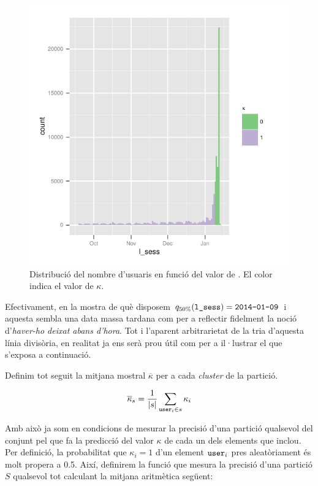\documentclass[
	a4paper,
	twoside,
	justified
]{tufte-book}
\begin{document}
\begin{figure}
\begin{center}
\includegraphics{l_sess_equitter_bar}
\caption{
\label{graph:l_sess_equitter_bar}
	Distribució del nombre d'usuaris en funció del valor de . El color indica el valor de $\kappa$.
}
\end{center}
\end{figure}

Efectivament, en la mostra de què disposem $q_{50\%}(\texttt{l\_sess}) = \texttt{2014-01-09}$ i aquesta sembla una data massa tardana com per a reflectir fidelment la noció d'\emph{haver-ho deixat abans d'hora}. Tot i l'aparent arbitrarietat de la tria d'aquesta línia divisòria, en realitat ja ens serà prou útil com per a il·lustrar el que s'exposa a continuació. 

Definim tot seguit la mitjana mostral $\overline{\kappa}$ per a cada \emph{cluster} de la partició.      

$$
	\overline{\kappa}_s = \frac{1}{|s|} \displaystyle \sum_{\texttt{user}_i \in s} \kappa_i
$$

Amb això ja som en condicions de mesurar la precisió d'una partició qualsevol del conjunt  pel que fa la predicció del valor $\kappa$ de cada un dels elements que inclou. Per definició, la probabilitat que $\kappa_i = 1$ d'un element $\texttt{user}_i$ pres aleatòriament és molt propera a 0.5. Així, definirem la funció que mesura la precisió d'una partició $S$ qualsevol tot calculant la mitjana aritmètica següent:
\end{document}
